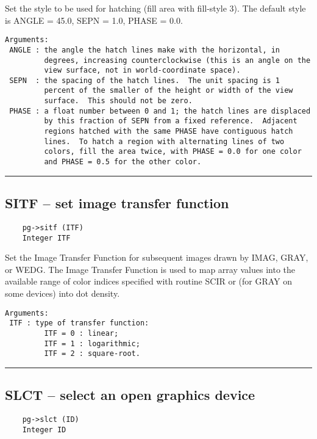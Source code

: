 Set the style to be used for hatching (fill area with fill-style 3).
The default style is ANGLE = 45.0, SEPN = 1.0, PHASE = 0.0.

\begin{verbatim}
Arguments:
 ANGLE : the angle the hatch lines make with the horizontal, in
         degrees, increasing counterclockwise (this is an angle on the
         view surface, not in world-coordinate space).  
 SEPN  : the spacing of the hatch lines.  The unit spacing is 1
         percent of the smaller of the height or width of the view
         surface.  This should not be zero.
 PHASE : a float number between 0 and 1; the hatch lines are displaced
         by this fraction of SEPN from a fixed reference.  Adjacent
         regions hatched with the same PHASE have contiguous hatch
         lines.  To hatch a region with alternating lines of two
         colors, fill the area twice, with PHASE = 0.0 for one color
         and PHASE = 0.5 for the other color. 
\end{verbatim}

\hrule

\subsection*{SITF -- set image transfer function }

\begin{verbatim}
    pg->sitf (ITF)
    Integer ITF
\end{verbatim}

Set the Image Transfer Function for subsequent images drawn by IMAG,
GRAY, or WEDG.  The Image Transfer Function is used to map array
values into the available range of color indices specified with
routine SCIR or (for GRAY on some devices) into dot density.

\begin{verbatim}
Arguments:
 ITF : type of transfer function:
         ITF = 0 : linear;
         ITF = 1 : logarithmic;
         ITF = 2 : square-root.
\end{verbatim}

\hrule

\subsection*{SLCT -- select an open graphics device }

\begin{verbatim}
    pg->slct (ID)
    Integer ID
\end{verbatim}

